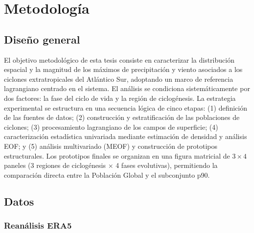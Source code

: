 \chapter{Metodología}\label{ch:metodologia}


\section{Diseño general}\label{sec:diseno_general}

El objetivo metodológico de esta tesis consiste en caracterizar la distribución espacial y la magnitud de los máximos de precipitación y viento asociados a los ciclones extratropicales del Atlántico Sur, adoptando un marco de referencia lagrangiano centrado en el sistema. El análisis se condiciona sistemáticamente por dos factores: la fase del ciclo de vida y la región de ciclogénesis. La estrategia experimental se estructura en una secuencia lógica de cinco etapas: (1) definición de las fuentes de datos; (2) construcción y estratificación de las poblaciones de ciclones; (3) procesamiento lagrangiano de los campos de superficie; (4) caracterización estadística univariada mediante estimación de densidad y análisis EOF; y (5) análisis multivariado (MEOF) y construcción de prototipos estructurales. Los prototipos finales se organizan en una figura matricial de $3 \times 4$ paneles (3 regiones de ciclogénesis $\times$ 4 fases evolutivas), permitiendo la comparación directa entre la Población Global y el subconjunto p90.


\section{Datos}\label{sec:datos}

\subsection{Reanálisis ERA5}\label{sec:datos_era5}

